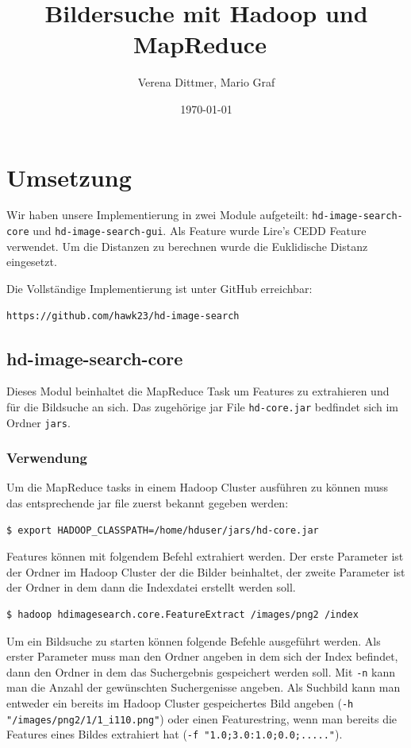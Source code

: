 \documentclass[paper=a4, fontsize=11pt]{scrartcl} %
\title{	
\normalfont \normalsize 
\huge Bildersuche mit Hadoop und MapReduce\ %
\horrule{0.2pt} %
}
\author{Verena Dittmer, Mario Graf} %
\date{\normalsize\today} %
\numberwithin{equation}{section} %
\numberwithin{figure}{section} %
\numberwithin{table}{section} %
\begin{document}
\maketitle %
\lstset{style=base}

\section{Umsetzung}

Wir haben unsere Implementierung in zwei Module aufgeteilt: \lstinline$hd-image-search-core$ und \lstinline$hd-image-search-gui$. Als Feature wurde Lire's CEDD Feature verwendet. Um die Distanzen zu berechnen wurde die Euklidische Distanz eingesetzt.

Die Vollständige Implementierung ist unter GitHub erreichbar:
\begin{lstlisting}
https://github.com/hawk23/hd-image-search
\end{lstlisting}

\subsection{hd-image-search-core}
Dieses Modul beinhaltet die MapReduce Task um Features zu extrahieren und für die Bildsuche an sich. Das zugehörige jar File \lstinline$hd-core.jar$ bedfindet sich im Ordner \lstinline$jars$.

\subsubsection{Verwendung}
Um die MapReduce tasks in einem Hadoop Cluster ausführen zu können muss das entsprechende jar file zuerst bekannt gegeben werden:
\begin{lstlisting}
$ export HADOOP_CLASSPATH=/home/hduser/jars/hd-core.jar
\end{lstlisting}

Features können mit folgendem Befehl extrahiert werden. Der erste Parameter ist der Ordner im Hadoop Cluster der die Bilder beinhaltet, der zweite Parameter ist der Ordner in dem dann die Indexdatei erstellt werden soll.
\begin{lstlisting}
$ hadoop hdimagesearch.core.FeatureExtract /images/png2 /index
\end{lstlisting}

Um ein Bildsuche zu starten können folgende Befehle ausgeführt werden. Als erster Parameter muss man den Ordner angeben in dem sich der Index befindet, dann den Ordner in dem das Suchergebnis gespeichert werden soll. Mit \lstinline$-n$ kann man die Anzahl der gewünschten Suchergenisse angeben. Als Suchbild kann man entweder ein bereits im Hadoop Cluster gespeichertes Bild angeben (\lstinline$-h "/images/png2/1/1_i110.png"$) oder einen Featurestring, wenn man bereits die Features eines Bildes extrahiert hat (\lstinline$-f "1.0;3.0:1.0;0.0;....."$).
\end{document}
